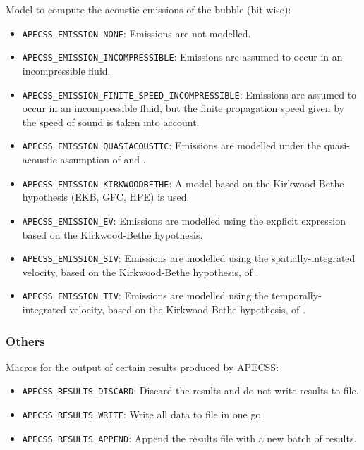 Model to compute the acoustic emissions of the bubble (bit-wise):\vspace{-1em}
\begin{itemize}[noitemsep]
  \item {\tt APECSS\_EMISSION\_NONE}: Emissions are not modelled.
  \item {\tt APECSS\_EMISSION\_INCOMPRESSIBLE}: Emissions are assumed to occur in an incompressible fluid.
  \item {\tt APECSS\_EMISSION\_FINITE\_SPEED\_INCOMPRESSIBLE}: Emissions are assumed to occur in an incompressible fluid, but the finite propagation speed given by the speed of sound is taken into account.
  \item {\tt APECSS\_EMISSION\_QUASIACOUSTIC}: Emissions are modelled under the quasi-acoustic assumption of \citet{Trilling1952} and \citet{Gilmore1952}.
  \item {\tt APECSS\_EMISSION\_KIRKWOODBETHE}: A model based on the Kirkwood-Bethe hypothesis (EKB, GFC, HPE) is used.
  \item {\tt APECSS\_EMISSION\_EV}: Emissions are modelled using the explicit expression based on the Kirkwood-Bethe hypothesis.
  \item {\tt APECSS\_EMISSION\_SIV}: Emissions are modelled using the spatially-integrated velocity, based on the Kirkwood-Bethe hypothesis, of \citet{Gilmore1952}.
  \item {\tt APECSS\_EMISSION\_TIV}: Emissions are modelled using the temporally-integrated velocity, based on the Kirkwood-Bethe hypothesis, of \citet{Hickling1963}.
\end{itemize}

\subsubsection{Others}
\label{sec:using_macros_others}

Macros for the output of certain results produced by APECSS:\vspace{-1em}
\begin{itemize}[noitemsep]
  \item {\tt APECSS\_RESULTS\_DISCARD}: Discard the results and do not write results to file.
  \item {\tt APECSS\_RESULTS\_WRITE}:  Write all data to file in one go.
  \item {\tt APECSS\_RESULTS\_APPEND}: Append the results file with a new batch of results.
\end{itemize}

